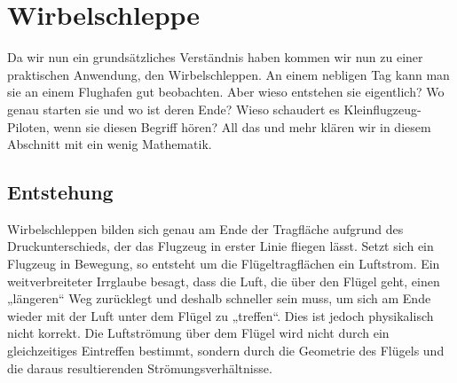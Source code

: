 %
%
%
\section{Wirbelschleppe}
Da wir nun ein grundsätzliches Verständnis haben kommen wir nun zu einer praktischen Anwendung, den Wirbelschleppen.
An einem nebligen Tag kann man sie an einem Flughafen gut beobachten. 
Aber wieso entstehen sie eigentlich? 
Wo genau starten sie und wo ist deren Ende?
Wieso schaudert es Kleinflugzeug-Piloten, wenn sie diesen Begriff hören?
All das und mehr klären wir in diesem Abschnitt mit ein wenig Mathematik.


\subsection{Entstehung}
Wirbelschleppen bilden sich genau am Ende der Tragfläche aufgrund des Druckunterschieds, der das Flugzeug in erster Linie fliegen lässt.
Setzt sich ein Flugzeug in Bewegung, so entsteht um die Flügeltragflächen ein Luftstrom.
Ein weitverbreiteter Irrglaube besagt, dass die Luft, die über den Flügel geht, einen „längeren“ Weg zurücklegt und deshalb schneller sein muss, um sich am Ende wieder mit der Luft unter dem Flügel zu „treffen“.
Dies ist jedoch physikalisch nicht korrekt.
Die Luftströmung über dem Flügel wird nicht durch ein gleichzeitiges Eintreffen bestimmt, sondern durch die Geometrie des Flügels und die daraus resultierenden Strömungsverhältnisse.

